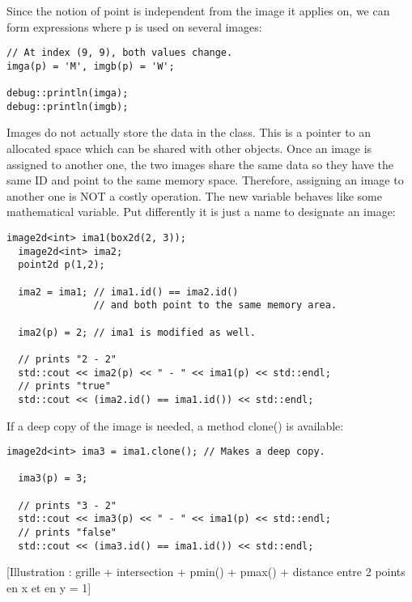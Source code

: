 \documentclass{report}
\begin{document}
Since the notion of point is independent from the image it applies on, we can
form expressions where p is used on several images:
\begin{lstlisting}[frame=single]
// At index (9, 9), both values change.
imga(p) = 'M', imgb(p) = 'W';

debug::println(imga);
debug::println(imgb);
\end{lstlisting}


Images do not actually store the data in the class. This is a pointer
to an allocated space which can be shared with other objects. Once an image is
assigned to another one, the two images share the same data so they have the
same ID and point to the same memory space.
Therefore, assigning an image to another one is NOT a costly operation. The new
variable behaves like some mathematical variable.  Put differently it is just a
name to designate an image:
\begin{lstlisting}[frame=single]
  image2d<int> ima1(box2d(2, 3));
  image2d<int> ima2;
  point2d p(1,2);

  ima2 = ima1; // ima1.id() == ima2.id()
               // and both point to the same memory area.

  ima2(p) = 2; // ima1 is modified as well.

  // prints "2 - 2"
  std::cout << ima2(p) << " - " << ima1(p) << std::endl;
  // prints "true"
  std::cout << (ima2.id() == ima1.id()) << std::endl;
\end{lstlisting}

If a deep copy of the image is needed, a method clone() is available:
\begin{lstlisting}[frame=single]
  image2d<int> ima3 = ima1.clone(); // Makes a deep copy.

  ima3(p) = 3;

  // prints "3 - 2"
  std::cout << ima3(p) << " - " << ima1(p) << std::endl;
  // prints "false"
  std::cout << (ima3.id() == ima1.id()) << std::endl;
\end{lstlisting}

[Illustration : grille + intersection + pmin() + pmax() + distance entre 2
points en x et en y = 1]\\
\end{document}
